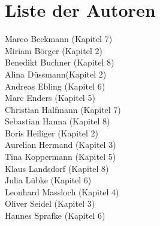 \chapter*{Liste der Autoren}
Marco Beckmann (Kapitel 7)\\
Miriam Börger (Kapitel 2)\\
Benedikt Buchner (Kapitel 8)\\
Alina Düssmann(Kapitel 2)\\
Andreas Ebling (Kapitel 6)\\
Marc Enders (Kapitel 5)\\
Christian Halfmann (Kapitel 7)\\
Sebastian Hanna (Kapitel 8)\\
Boris Heiliger (Kapitel 2)\\
Aurelian Hermand (Kapitel 3)\\
Tina Koppermann (Kapitel 5)\\
Klaus Landsdorf (Kapitel 8)\\
Julia Lübke (Kapitel 6)\\
Leonhard Massloch (Kapitel 4)\\
Oliver Seidel (Kapitel 3)\\
Hannes Sprafke (Kapitel 6)\\

